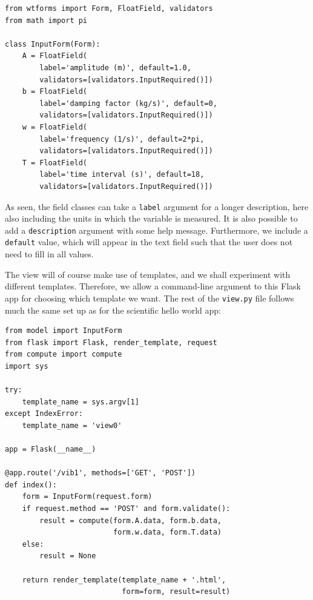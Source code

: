 \documentclass[%
oneside,                 %
final,                   %
10pt]{article}
\begin{document}
{\begin{Verbatim}[numbers=none,fontsize=\fontsize{9pt}{9pt},baselinestretch=0.85]
from wtforms import Form, FloatField, validators
from math import pi

class InputForm(Form):
    A = FloatField(
        label='amplitude (m)', default=1.0,
        validators=[validators.InputRequired()])
    b = FloatField(
        label='damping factor (kg/s)', default=0,
        validators=[validators.InputRequired()])
    w = FloatField(
        label='frequency (1/s)', default=2*pi,
        validators=[validators.InputRequired()])
    T = FloatField(
        label='time interval (s)', default=18,
        validators=[validators.InputRequired()])
\end{Verbatim}

As seen, the field classes can take a \Verb!label! argument for a longer
description, here also including the units in which the variable is
measured. It is also possible to add a \Verb!description! argument with
some help message. Furthermore, we include a \Verb!default! value, which
will appear in the text field such that the user does not need to
fill in all values.


The view will of course make use of templates, and we shall experiment
with different templates. Therefore, we allow a command-line argument
to this Flask app for choosing which template we want. The rest of
the \Verb!view.py! file follows much the same set up as for the scientific
hello world app:

\begin{Verbatim}[numbers=none,fontsize=\fontsize{9pt}{9pt},baselinestretch=0.85]
from model import InputForm
from flask import Flask, render_template, request
from compute import compute
import sys

try:
    template_name = sys.argv[1]
except IndexError:
    template_name = 'view0'

app = Flask(__name__)

@app.route('/vib1', methods=['GET', 'POST'])
def index():
    form = InputForm(request.form)
    if request.method == 'POST' and form.validate():
        result = compute(form.A.data, form.b.data,
                         form.w.data, form.T.data)
    else:
        result = None

    return render_template(template_name + '.html',
                           form=form, result=result)
\end{Verbatim}

}
\end{document}
